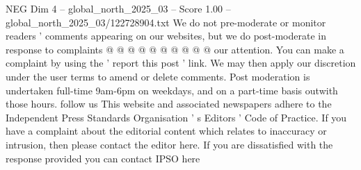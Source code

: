 \begin{textsample}{NEG Dim 4 – global\_north\_2025\_03 – Score 1.00 – global\_north\_2025\_03/122728904.txt}
We do not pre-moderate or monitor readers ' comments appearing on our websites, but we do post-moderate in response to complaints @ @ @ @ @ @ @ @ @ @ our attention.
You can make a complaint by using the ' report this post ' link.
We may then apply our discretion under the user terms to amend or delete comments.
Post moderation is undertaken full-time 9am-6pm on weekdays, and on a part-time basis outwith those hours. follow us This website and associated newspapers adhere to the Independent Press Standards Organisation ' s Editors ' Code of Practice.
If you have a complaint about the editorial content which relates to inaccuracy or intrusion, then please contact the editor here.
If you are dissatisfied with the response provided you can contact IPSO here

\end{textsample}
